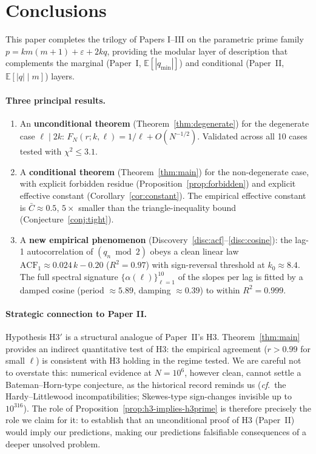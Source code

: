 \documentclass[11pt,a4paper]{article}
\theoremstyle{plain}
\theoremstyle{definition}
\newcommand{\qmin}{q_{\min}}
\newcommand{\E}{\mathbb{E}}
\newcommand{\eps}{\varepsilon}
\begin{document}
\section{Conclusions}

This paper completes the trilogy of Papers I--III on the parametric prime
family $p = km(m+1) + \eps + 2kq$, providing the modular layer of description
that complements the marginal (Paper~I, $\E[|\qmin|]$) and conditional
(Paper~II, $\E[|q|\mid m]$) layers.

\paragraph{Three principal results.}
\begin{enumerate}[leftmargin=*]
\item An \textbf{unconditional theorem} (Theorem~\ref{thm:degenerate}) for
the degenerate case $\ell \mid 2k$: $F_N(r; k, \ell) = 1/\ell + O(N^{-1/2})$.
Validated across all 10 cases tested with $\chi^2 \le 3.1$.
\item A \textbf{conditional theorem} (Theorem~\ref{thm:main}) for the
non-degenerate case, with explicit forbidden residue
(Proposition~\ref{prop:forbidden}) and explicit effective constant
(Corollary~\ref{cor:constant}). The empirical effective constant is
$\bar C \approx 0.5$, $5\times$ smaller than the triangle-inequality bound
(Conjecture~\ref{conj:tight}).
\item A \textbf{new empirical phenomenon}
(Discovery~\ref{disc:acf}--\ref{disc:cosine}): the lag-1 autocorrelation of
$(q_n \bmod 2)$ obeys a clean linear law $\mathrm{ACF}_1 \approx 0.024\,k - 0.20$
($R^2 = 0.97$) with sign-reversal threshold at $k_0 \approx 8.4$. The full
spectral signature $\{\alpha(\ell)\}_{\ell=1}^{10}$ of the slopes per lag is
fitted by a damped cosine (period $\approx 5.89$, damping $\approx 0.39$)
to within $R^2 = 0.999$.
\end{enumerate}

\paragraph{Strategic connection to Paper II.} Hypothesis H3$'$ is a structural
analogue of Paper~II's H3. Theorem~\ref{thm:main} provides an indirect
quantitative test of H3: the empirical agreement ($r > 0.99$ for small $\ell$)
is consistent with H3 holding in the regime tested. We are careful not to
overstate this: numerical evidence at $N = 10^6$, however clean, cannot settle
a Bateman--Horn-type conjecture, as the historical record reminds us
(\textit{cf}.\ the Hardy--Littlewood incompatibilities; Skewes-type
sign-changes invisible up to $10^{316}$). The role of
Proposition~\ref{prop:h3-implies-h3prime} is therefore precisely the role we
claim for it: to establish that an unconditional proof of H3 (Paper~II) would
imply our predictions, making our predictions falsifiable consequences of a
deeper unsolved problem.
\end{document}
